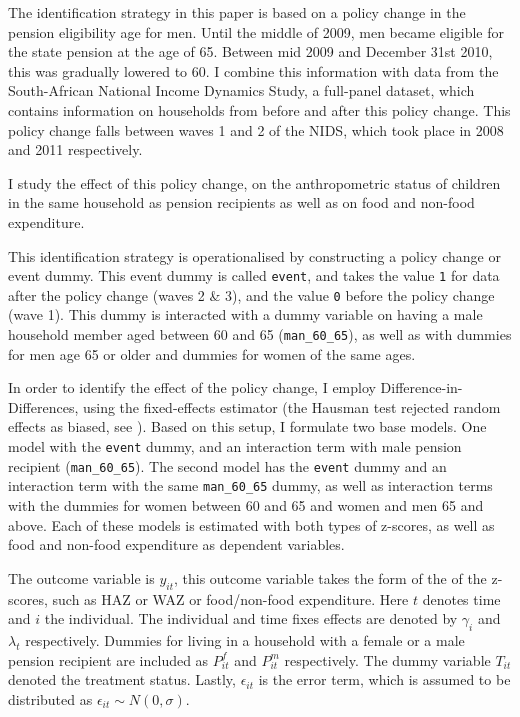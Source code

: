 \documentclass[a4paper,british]{article}\usepackage[]{graphicx}\usepackage[]{color}
\newcommand{\code}[1]{\texttt{#1}}
\begin{document}
\label{sec:methodology} The identification strategy in this paper
is based on a policy change in the pension eligibility age for men.
Until the middle of 2009, men became eligible for the state pension
at the age of 65. Between mid 2009 and December 31st 2010, this was
gradually lowered to 60. I combine this information with data from
the South-African National Income Dynamics Study, a full-panel dataset,
which contains information on households from before and after this
policy change. This policy change falls between waves 1 and 2 of the
NIDS, which took place in 2008 and 2011 respectively.

I study the effect of this policy change, on the anthropometric status
of children in the same household as pension recipients as well as
on food and non-food expenditure. 

This identification strategy is operationalised by constructing a
policy change or event dummy. This event dummy is called \code{event},
and takes the value \code{1} for data after the policy change (waves
2 \& 3), and the value \code{0} before the policy change (wave 1).
This dummy is interacted with a dummy variable on having a male household
member aged between 60 and 65 (\code{man\_60\_65}), as well as with
dummies for men age 65 or older and dummies for women of the same
ages.

In order to identify the effect of the policy change, I employ Difference-in-Differences,
using the fixed-effects estimator (the Hausman test rejected random
effects as biased, see ). Based on this setup,
I formulate two base models. One model with the \code{event} dummy,
and an interaction term with male pension recipient (\code{man\_60\_65}).
The second model has the \code{event} dummy and an interaction term
with the same \code{man\_60\_65} dummy, as well as interaction terms
with the dummies for women between 60 and 65 and women and men 65
and above. Each of these models is estimated with both types of z-scores,
as well as food and non-food expenditure as dependent variables.

The outcome variable is $y_{it}$, this outcome variable takes the
form of the of the z-scores, such as HAZ or WAZ or food/non-food expenditure.
Here $t$ denotes time and $i$ the individual. The individual and
time fixes effects are denoted by $\gamma_{i}$ and $\lambda_{t}$
respectively. Dummies for living in a household with a female or a
male pension recipient are included as $P_{it}^{f}$ and $P_{it}^{m}$
respectively. The dummy variable $T_{it}$ denoted the treatment status.
Lastly, $\epsilon_{it}$ is the error term, which is assumed to be
distributed as $\epsilon_{it}\sim N(0,\sigma)$.
\end{document}
